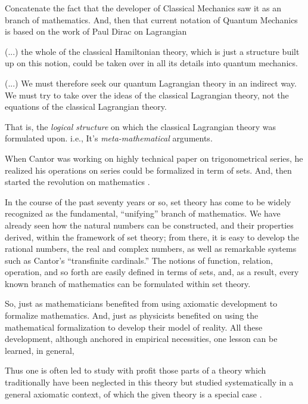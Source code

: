 \documentclass[
12pt,				%
openright,			%
oneside,			%
a4paper,			%
brazil,				%
english,			%
]{abntex2}
\begin{document}
Concatenate the fact that the developer of Classical Mechanics saw it
as an branch of mathematics. And, then that current notation of
Quantum Mechanics is based on the work of Paul Dirac on Lagrangian\cite{dirac2005lagrangian}

\begin{citacao}
(...) the whole of the classical Hamiltonian theory, which is just a structure built up on this notion, could be taken over in all its details into quantum mechanics.
  
(...) We must therefore seek our quantum Lagrangian theory in an
indirect way. We must try to take over the ideas of the classical
Lagrangian theory, not the equations of the classical Lagrangian
theory. \cite{dirac2005lagrangian}
\end{citacao}

That is, the \textit{logical structure} on which the classical
Lagrangian theory was formulated upon. i.e., It's \textit{meta-mathematical} arguments.

When Cantor was working on highly technical paper on trigonometrical
series, he realized his operations on series could be formalized in
term of sets. And, then started the revolution on mathematics \cite{pinter2014book}.

\begin{citacao}
In the course of the past seventy years or so, set theory has come to be
widely recognized as the fundamental, “unifying” branch of mathematics. We
have already seen how the natural numbers can be constructed, and
their properties derived, within the framework of set theory; from
there, it is easy to develop the rational numbers, the real and
complex numbers, as well as remarkable systems such as Cantor’s
“transfinite cardinals.” The notions of function, relation, operation,
and so forth are easily defined in terms of sets, and, as a result,
every known branch of mathematics can be formulated within set
theory. \cite{pinter2014book}
\end{citacao}

So, just as mathematicians benefited from using axiomatic
development to formalize mathematics. And, just as physicists
benefited on using the mathematical formalization to develop their
model of reality. All these development, although anchored in
empirical necessities, one lesson can be learned, in general,

\begin{citacao}
  Thus one is often led to study with profit those parts of a
  theory which traditionally have been neglected in this theory but studied
  systematically in a general axiomatic context, of which the given theory
  is a special case \cite{bourbaki2004theory}.
\end{citacao}
\end{document}
